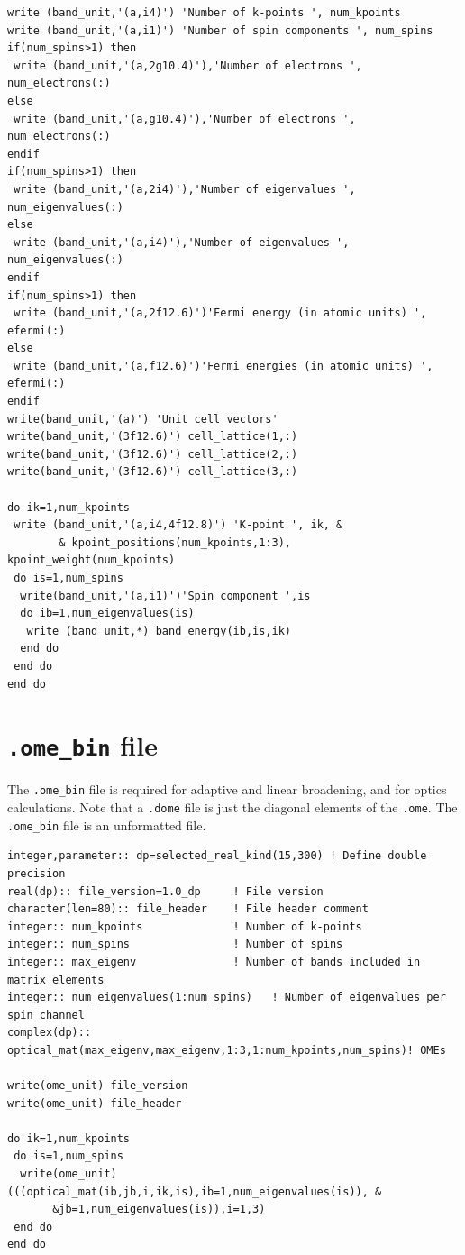 \documentclass[a4paper,11pt,twoside]{book}
\begin{document}
{\begin{appendix}
\begin{verbatim}
write (band_unit,'(a,i4)') 'Number of k-points ', num_kpoints
write (band_unit,'(a,i1)') 'Number of spin components ', num_spins
if(num_spins>1) then
 write (band_unit,'(a,2g10.4)'),'Number of electrons ', num_electrons(:)
else
 write (band_unit,'(a,g10.4)'),'Number of electrons ', num_electrons(:)
endif
if(num_spins>1) then
 write (band_unit,'(a,2i4)'),'Number of eigenvalues ', num_eigenvalues(:)
else
 write (band_unit,'(a,i4)'),'Number of eigenvalues ', num_eigenvalues(:)
endif
if(num_spins>1) then
 write (band_unit,'(a,2f12.6)')'Fermi energy (in atomic units) ', efermi(:)
else
 write (band_unit,'(a,f12.6)')'Fermi energies (in atomic units) ', efermi(:)
endif
write(band_unit,'(a)') 'Unit cell vectors'
write(band_unit,'(3f12.6)') cell_lattice(1,:)
write(band_unit,'(3f12.6)') cell_lattice(2,:)
write(band_unit,'(3f12.6)') cell_lattice(3,:)

do ik=1,num_kpoints
 write (band_unit,'(a,i4,4f12.8)') 'K-point ', ik, &
        & kpoint_positions(num_kpoints,1:3), kpoint_weight(num_kpoints)
 do is=1,num_spins
  write(band_unit,'(a,i1)')'Spin component ',is
  do ib=1,num_eigenvalues(is)
   write (band_unit,*) band_energy(ib,is,ik) 
  end do
 end do
end do
\end{verbatim}
\section{\texttt{.ome\_bin} file}
The \texttt{.ome\_bin} file is required for adaptive and linear broadening, and for optics calculations. 
%
Note that a \texttt{.dome} file is just the diagonal elements of the \texttt{.ome}.
%
The \texttt{.ome\_bin} file is an unformatted file.
\begin{verbatim}
integer,parameter:: dp=selected_real_kind(15,300) ! Define double precision
real(dp):: file_version=1.0_dp     ! File version
character(len=80):: file_header    ! File header comment
integer:: num_kpoints              ! Number of k-points
integer:: num_spins                ! Number of spins
integer:: max_eigenv               ! Number of bands included in matrix elements
integer:: num_eigenvalues(1:num_spins)   ! Number of eigenvalues per spin channel
complex(dp):: optical_mat(max_eigenv,max_eigenv,1:3,1:num_kpoints,num_spins)! OMEs

write(ome_unit) file_version
write(ome_unit) file_header

do ik=1,num_kpoints
 do is=1,num_spins
  write(ome_unit) (((optical_mat(ib,jb,i,ik,is),ib=1,num_eigenvalues(is)), &
       &jb=1,num_eigenvalues(is)),i=1,3)
 end do
end do
\end{verbatim}

\end{appendix}}
\end{document}
